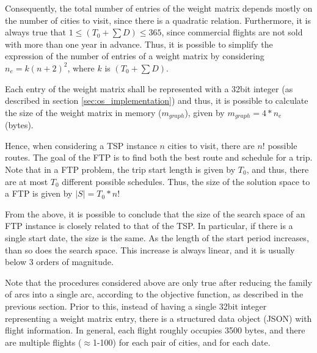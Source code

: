 Consequently, the total number of entries of the weight matrix depends mostly on the number of cities to visit, since there is a quadratic relation. Furthermore, it is always true that $1 \leq (T_{0} + \sum D) \leq 365$, since commercial flights are not sold with more than one year in advance. Thus, it is possible to simplify the expression of the number of entries of a weight matrix by considering $n_{e} = k(n+2)^2$, where $k$ is 
$(T_{0} + \sum D)$.

Each entry of the weight matrix shall be represented with a 32bit integer (as described in section \ref{sec:os_implementation}) and thus, it is possible to calculate the size of the weight matrix in memory ($m_{graph}$), given by $m_{graph} = 4*n_e$ (bytes). 


Hence, when considering a TSP instance $n$ cities to visit, there are $n!$ possible routes. The goal of the FTP is to find both the best route and schedule for a trip. Note that in a FTP problem, the trip start length is given by $T_{0}$, and thus, there are at most $T_{0}$ different possible schedules. Thus, the size of the solution space to a FTP is given by $|S| = T_{0}*n!$  

From the above, it is possible to conclude that the size of the search space of an FTP instance is closely related to that of the TSP. In particular, if there is a single start date, the size is the same. As the length of the start period increases, than so does the search space. This increase is always linear, and it is usually below 3 orders of magnitude. 

Note that the procedures considered above are only true after reducing the family of arcs into a single arc, according to the objective function, as described in the previous section. Prior to this, instead of having a single 32bit integer representing a weight matrix entry, there is a structured data object (JSON) with flight information. In general, each flight roughly occupies 3500 bytes, and there are multiple flights ($\approx$1-100) for each pair of cities, and for each date. 





